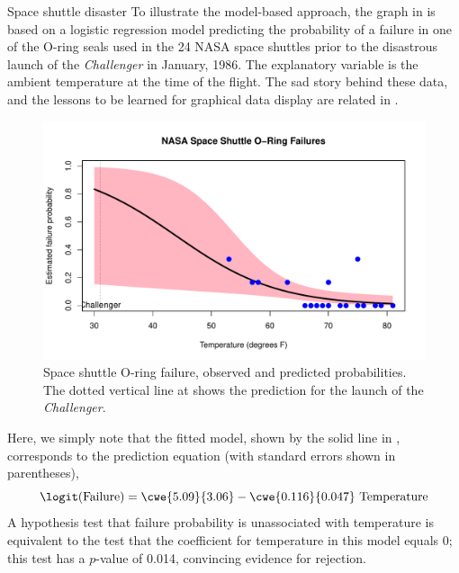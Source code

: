 \documentclass[11pt]{book}
\renewenvironment{knitrout}{\small\renewcommand{\baselinestretch}{.85}}{} %
\begin{document}
\begin{Example}[nasa0]{Space shuttle disaster}
To illustrate the model-based approach,
the graph in  is based on
a logistic regression model predicting the probability of a
failure in one of the O-ring seals used in the 24 NASA space shuttles
prior to the disastrous launch of the 
\emph{Challenger} in January, 1986.  The explanatory variable is the ambient temperature at the time of the flight.
The sad story behind these data, and the lessons to be learned for
graphical data display are related in .

\begin{knitrout}
\color{fgcolor}\begin{figure}[!htbp]


\centerline{\includegraphics[width=.7\textwidth]{ch01/fig/spaceshuttle0} }

\caption[Space shuttle O-ring failure, observed and predicted probabilities]{Space shuttle O-ring failure, observed and predicted probabilities. The dotted vertical line at  shows the prediction for the launch of the \emph{Challenger}.\label{fig:spaceshuttle0}}
\end{figure}


\end{knitrout}

Here, we simply note that the fitted model, shown by the solid line in
, corresponds to the prediction equation
(with standard errors shown in parentheses),
\begin{equation*}
 \logit ( \mbox{Failure} ) =  \cwe{5.09}{3.06} - \cwe{0.116}{0.047} \mbox{ Temperature} 
 \end{equation*}%
A hypothesis test that failure probability is unassociated with temperature
is equivalent to the test that the coefficient for temperature in this
model equals 0; this test has a $p$-value of 0.014, convincing evidence
for rejection.


\end{Example}
\end{document}
